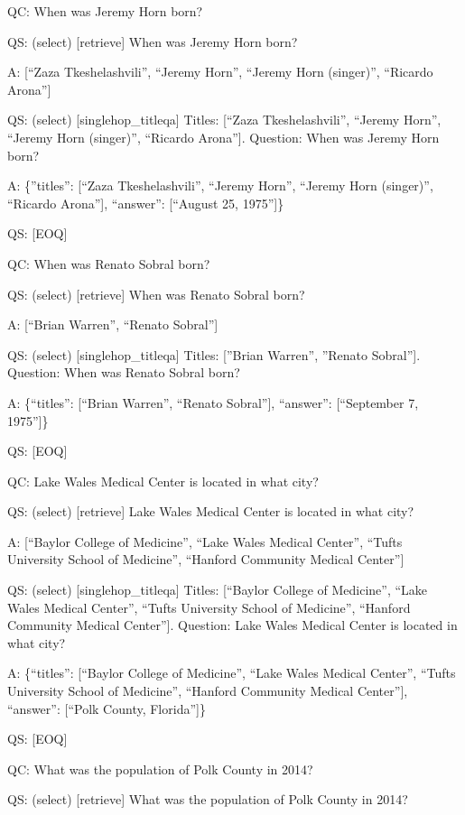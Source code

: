\documentclass[
]{article}
\begin{document}
QC: When was Jeremy Horn born?

QS: (select) {[}retrieve{]} When was Jeremy Horn born?

A: {[}``Zaza Tkeshelashvili'', ``Jeremy Horn'', ``Jeremy Horn
(singer)'', ``Ricardo Arona''{]}

QS: (select) {[}singlehop\_titleqa{]} Titles: {[}``Zaza
Tkeshelashvili'', ``Jeremy Horn'', ``Jeremy Horn (singer)'', ``Ricardo
Arona''{]}. Question: When was Jeremy Horn born?

A: \{''titles'': {[}``Zaza Tkeshelashvili'', ``Jeremy Horn'', ``Jeremy
Horn (singer)'', ``Ricardo Arona''{]}, ``answer'': {[}``August 25,
1975''{]}\}

QS: {[}EOQ{]}

QC: When was Renato Sobral born?

QS: (select) {[}retrieve{]} When was Renato Sobral born?

A: {[}``Brian Warren'', ``Renato Sobral''{]}

QS: (select) {[}singlehop\_titleqa{]} Titles: {[}''Brian Warren'',
''Renato Sobral''{]}. Question: When was Renato Sobral born?

A: \{``titles'': {[}``Brian Warren'', ``Renato Sobral''{]}, ``answer'':
{[}``September 7, 1975''{]}\}

QS: {[}EOQ{]}

QC: Lake Wales Medical Center is located in what city?

QS: (select) {[}retrieve{]} Lake Wales Medical Center is located in what
city?

A: {[}``Baylor College of Medicine'', ``Lake Wales Medical Center'',
``Tufts University School of Medicine'', ``Hanford Community Medical
Center''{]}

QS: (select) {[}singlehop\_titleqa{]} Titles: {[}``Baylor College of
Medicine'', ``Lake Wales Medical Center'', ``Tufts University School of
Medicine'', ``Hanford Community Medical Center''{]}. Question: Lake
Wales Medical Center is located in what city?

A: \{``titles'': {[}``Baylor College of Medicine'', ``Lake Wales Medical
Center'', ``Tufts University School of Medicine'', ``Hanford Community
Medical Center''{]}, ``answer'': {[}``Polk County, Florida''{]}\}

QS: {[}EOQ{]}

QC: What was the population of Polk County in 2014?

QS: (select) {[}retrieve{]} What was the population of Polk County in
2014?
\end{document}
